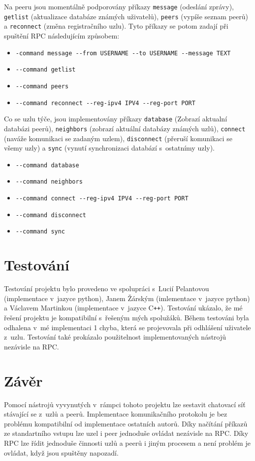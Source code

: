 \documentclass[11pt,a4paper,titlepage]{article}
\begin{document}
            Na peeru jsou momentálně podporovány
            příkazy \texttt{message} (odeslání zprávy), \texttt{getlist} (aktualizace databáze známých uživatelů),
            \texttt{peers} (vypíše seznam peerů) a \texttt{reconnect} (změna registračního uzlu).
            Tyto příkazy se potom zadají při spuštění RPC následujícím způsobem:
            \begin{itemize}
                \item \verb+-command message --from USERNAME --to USERNAME --message TEXT+
                \item \verb+--command getlist+
                \item \verb+--command peers+
                \item \verb+--command reconnect --reg-ipv4 IPV4 --reg-port PORT+
            \end{itemize}

            Co se uzlu týče, jsou implementovány příkazy \texttt{database} (Zobrazí aktualní databázi peerů),
            \texttt{neighbors} (zobrazí aktuální databázy známých uzlů), \texttt{connect} (naváže komunikaci se zadaným uzlem),
            \texttt{disconnect} (přeruší komunikaci se všemy uzly) a \texttt{sync} (vynutí synchronizaci databází s~ostatnímy uzly).
            \begin{itemize}
                \item \verb+--command database+
                \item \verb+--command neighbors+
                \item \verb+--command connect --reg-ipv4 IPV4 --reg-port PORT+
                \item \verb+--command disconnect+
                \item \verb+--command sync+
            \end{itemize}

    \section{Testování}
        Testování projektu bylo provedeno ve spolupráci s~Lucií Pelantovou (implementace v~jazyce python), Janem Žárským (imlementace v~jazyce python) a Václavem Martinkou (implementace v~jazyce
        C\texttt{++}). Testování ukázalo, že mé řešení projektu je kompatibilní s~řešeným mých spolužáků. Během testováni byla odhalena v~mé implementaci 1 chyba,
        která se projevovala při odhlášení uživatele z~uzlu. Testování také prokázalo použitelnost implementovaných nástrojů nezávisle na RPC.
    \section{Závěr}
        Pomocí nástrojů vyvynutých v~rámpci tohoto projektu lze sestavit chatovací síť stávající se z~uzlů a peerů. Implementace komunikačního
        protokolu je bez problému kompatibilní od implementace ostatních autorů. Díky načítání příkazů ze standartního vstupu lze uzel i peer
        jednoduše ovládat nezávisle na RPC. Díky RPC lze řídit jednoduše činnosti uzlů a peerů i jiným procesem a není problém je ovládat,
        když jsou spuštěny napozadí.
\end{document}
